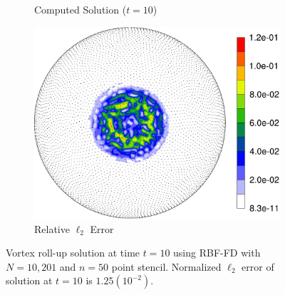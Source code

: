 \documentclass{report}
\begin{document}
\begin{figure}
\begin{center}
\begin{subfigure}[b]{0.49\textwidth}
	\caption{Computed Solution ($t=10$)}
	\label{fig:vortex_approx}
\end{subfigure} 
\begin{subfigure}[b]{0.49\textwidth}
	\centering
	\includegraphics[width=1.0\textwidth]{../figures/paper1/figures/vortex_rollup/vortexRelativeError-eps-converted-to.pdf}
	\caption{Relative $\ell_2$ Error}
	\label{fig:vortex_relerr}
\end{subfigure}
\caption{Vortex roll-up solution at time $t=10$ using RBF-FD with $N=10,201$ and $n=50$ point stencil. Normalized $\ell_2$ error of solution at $t=10$ is $1.25(10^{-2})$. }
\label{fig:vortex_t10}
\end{center}
\end{figure}
\end{document}
